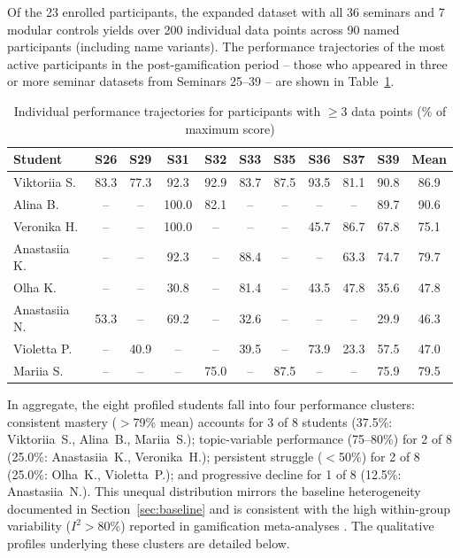 Of the 23 enrolled participants, the expanded dataset with all 36 seminars and 7 modular controls yields over 200 individual data points across 90 named participants (including name variants). The performance trajectories of the most active participants in the post-gamification period -- those who appeared in three or more seminar datasets from Seminars 25--39 -- are shown in Table~\ref{tab:trajectories}.

\begin{table}[!h]
\centering
\caption{Individual performance trajectories for participants with $\geq$3 data points (\% of maximum score)}
\label{tab:trajectories}
\small
\begin{tabular}{l*{9}{c}c}
\hline
\textbf{Student} & \textbf{S26} & \textbf{S29} & \textbf{S31} & \textbf{S32} & \textbf{S33} & \textbf{S35} & \textbf{S36} & \textbf{S37} & \textbf{S39} & \textbf{Mean} \\
\hline
Viktoriia S. & 83.3 & 77.3 & 92.3 & 92.9 & 83.7 & 87.5 & 93.5 & 81.1 & 90.8 & 86.9 \\
Alina B. & -- & -- & 100.0 & 82.1 & -- & -- & -- & -- & 89.7 & 90.6 \\
Veronika H. & -- & -- & 100.0 & -- & -- & -- & 45.7 & 86.7 & 67.8 & 75.1 \\
Anastasiia K. & -- & -- & 92.3 & -- & 88.4 & -- & -- & 63.3 & 74.7 & 79.7 \\
Olha K. & -- & -- & 30.8 & -- & 81.4 & -- & 43.5 & 47.8 & 35.6 & 47.8 \\
Anastasiia N. & 53.3 & -- & 69.2 & -- & 32.6 & -- & -- & -- & 29.9 & 46.3 \\
Violetta P. & -- & 40.9 & -- & -- & 39.5 & -- & 73.9 & 23.3 & 57.5 & 47.0 \\
Mariia S. & -- & -- & -- & 75.0 & -- & 87.5 & -- & -- & 75.9 & 79.5 \\
\hline
\end{tabular}
\end{table}

In aggregate, the eight profiled students fall into four performance clusters: consistent mastery ($>$79\% mean) accounts for 3 of 8 students (37.5\%: Viktoriia~S., Alina~B., Mariia~S.); topic-variable performance (75--80\%) for 2 of 8 (25.0\%: Anastasiia~K., Veronika~H.); persistent struggle ($<$50\%) for 2 of 8 (25.0\%: Olha~K., Violetta~P.); and progressive decline for 1 of 8 (12.5\%: Anastasiia~N.). This unequal distribution mirrors the baseline heterogeneity documented in Section~\ref{sec:baseline} and is consistent with the high within-group variability ($I^2 > 80\%$) reported in gamification meta-analyses \cite{SailerHomner2020, BaiHewHuang2020}. The qualitative profiles underlying these clusters are detailed below.

